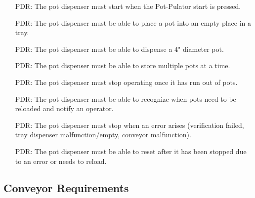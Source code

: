 \documentclass[12pt]{article}
\newcounter{pdreqnum} %
\newcounter{reqnum} %
\begin{document}
  \noindent \begin{itemize}
  
  \item[PDR\refstepcounter{pdreqnum}\thepdreqnum \label{R_Pot0}:] {The pot dispenser must
      start when the Pot-Pulator start is pressed.}
  
  \item[PDR\refstepcounter{pdreqnum}\thepdreqnum \label{R_Pot1}:] {The pot dispenser must
      be able to place a pot into an empty place in a tray.}
  
  \item[PDR\refstepcounter{pdreqnum}\thepdreqnum \label{R_Pot2}:] {The pot dispenser must
      be able to dispense a 4" diameter pot.}
  
  \item[PDR\refstepcounter{pdreqnum}\thepdreqnum \label{R_Pot3}:] {The pot dispenser must
      be able to store multiple pots at a time.}
  
  \item[PDR\refstepcounter{pdreqnum}\thepdreqnum \label{R_Pot6}:] {The pot dispenser must
      stop operating once it has run out of pots.}
  
  \item[PDR\refstepcounter{pdreqnum}\thepdreqnum \label{R_Pot7}:] {The pot dispenser must
      be able to recognize when pots need to be reloaded and notify an operator.}
  
  \item[PDR\refstepcounter{pdreqnum}\thepdreqnum \label{R_Pot8}:] {The pot dispenser must
      stop when an error arises (verification failed, tray dispenser malfunction/empty, conveyor
      malfunction).}
  
  \item[PDR\refstepcounter{pdreqnum}\thepdreqnum \label{R_Pot9}:] {The pot dispenser must
      be able to reset after it has been stopped due to an error or needs to reload.}
  
  \end{itemize}
  
  \subsection{Conveyor Requirements}
  
\end{document}
